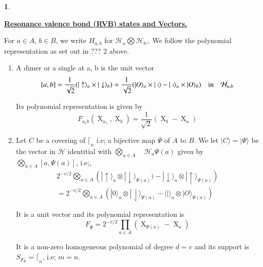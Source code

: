 \documentclass[a4paper,12pt]{article}
\DeclareMathOperator{\x}{\mathrm{X}}
\theoremstyle{definition}
\theoremstyle{underlinethm}
\theoremstyle{underline}
\newtheorem{subsubsec}{}[subsection]
\begin{document}
\begin{subsubsec}\label{subsubsection-3.1.2}

\underline{\bfseries Resonance valence bond (RVB) states and Vectors.}

For $a\in A$, $b \in B$, we write $H_{a,b}$ for $\mathcal{H}_{a} \bigotimes \mathcal{H}_{b}$,. We follow the polynomial representation as set out in ??? 2 above.

\begin{enumerate}[label=(\alph*)]
\item A dimer or a single at a, b is the unit vector
$$
[a, b] = \frac{1}{\sqrt{2}} (| \uparrow \rangle_{a} \times | \downarrow \rangle_{b}) = \frac{1}{\sqrt{2}}(| O\rangle_{a} \times | \shortmid \rangle - | \shortmid \rangle_{a} \times | O \rangle_{b})\quad {\rm in} \quad  \mathcal{H}_{a,b} 
$$

Its polynomial representation is given by
\begin{equation*}
F_{a_{1}b}(\x_{a_{1}}, \x_{b}) = \frac{1}{\sqrt{2}}(\x_{b}- \x_{a})\tag{3.3}
\end{equation*}

\item Let  $C$ be a covering of $\lceil_{n}$ i.e; a bijective map $\Psi$ of $A$ to $B$. We let $| C \rangle = | \Psi \rangle$ be the vector in $\mathcal{H}$ identitial with $\bigotimes\limits_{a \in A} \quad \mathcal{H}_{a}\Psi(a)$ given by $\bigotimes\limits_{a \in A} [a, \Psi(a)]$, i.e;,
\begin{gather*}
2^{-v/2} \bigotimes\limits_{a \in A} \left(| \uparrow \rangle_{a} \otimes | \downarrow \rangle_{\Psi (a)}) - | \downarrow \rangle_{a} \otimes | \uparrow \rangle_{\Psi (a)}\right)\\
= 2^{-v/2} \bigotimes\limits_{a\in A} \left(|0\rangle_{a} \otimes | \downharpoonleft \rangle_{\Psi(a)} - || \rangle_{a} \otimes | O \rangle_{\Psi(a)}\right)
\end{gather*}
 
 
It is a unit vector and its polynomial representation is 
\begin{equation}
F_{\underline{\overline{\Psi}}} = 2^{-v/2} \prod\limits_{a\in A}(\x_{\Psi(a)}- \x_{a})\tag{3.4}\label{eq-3.4}
\end{equation}

It is a non-zero homogeneous polynomial of degree $d=v$ and its support is $S_{F_{\Psi}} = \lceil_{n}$, i.e; $m=n$.


\end{enumerate}
\end{subsubsec}
\end{document}
